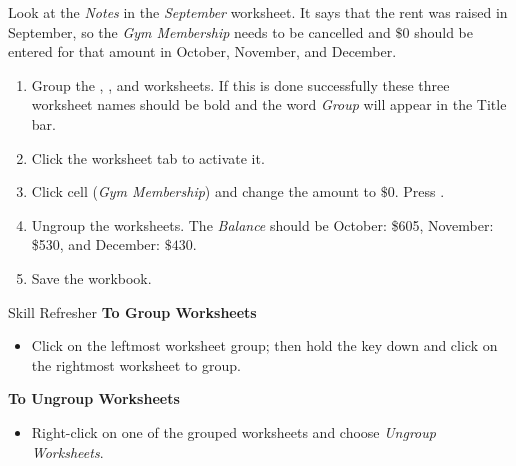 Look at the \textit{Notes} in the \textit{September} worksheet. It says that the rent was raised in September, so the \textit{Gym Membership} needs to be cancelled and $ \$0 $ should be entered for that amount in October, November, and December.

\begin{enumerate}
	\item Group the , , and  worksheets. If this is done successfully these three worksheet names should be bold and the word \textit{Group} will appear in the Title bar.
	\item Click the  worksheet tab to activate it.
	\item Click cell  (\textit{Gym Membership}) and change the amount to $ \$0 $. Press .
	\item Ungroup the worksheets. The \textit{Balance} should be October: \$605, November: \$530, and December: $ \$430 $.
	\item Save the  workbook.
\end{enumerate}

\begin{center}
	\begin{sklbox}{Skill Refresher}
		\textbf{To Group Worksheets}
		\\
		\begin{itemize}
			\setlength{\itemsep}{0pt}
			\setlength{\parskip}{0pt}
			\setlength{\parsep}{0pt}
			
			\item Click on the leftmost worksheet group; then hold the  key down and click on the rightmost worksheet to group.
		\end{itemize}
			
		\bigskip
			
		\textbf{To Ungroup Worksheets}
		\begin{itemize}
			\setlength{\itemsep}{0pt}
			\setlength{\parskip}{0pt}
			\setlength{\parsep}{0pt}
			
			\item Right-click on one of the grouped worksheets and choose \textit{Ungroup Worksheets}.
		\end{itemize}
	\end{sklbox}
\end{center}


